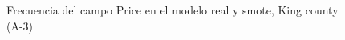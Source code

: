 \begin{figure}[H]
    \centering
    
    \caption{Frecuencia del campo Price en el modelo real y smote, King county (A-3)}
    \label{frecuency-smote-price}
\end{figure}